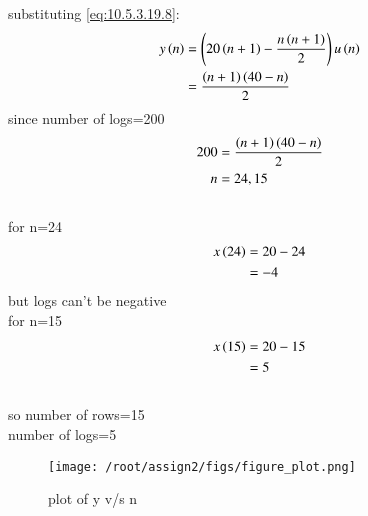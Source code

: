 \documentclass[journal,12pt,twocolumn]{IEEEtran}
\theoremstyle{remark}
\begin{document}
substituting  \eqref{eq:10.5.3.19.8}:
\begin{align}
y\left(n\right)&=\left(20\left(n+1\right)-\frac{n\left(n+1\right)}{2}\right)u\left(n\right)
\\&=\frac{\left(n+1\right)\left(40-n\right)}{2}
\end{align}
since number of logs=200
\begin{align}
 200&=\frac{\left(n+1\right)\left(40-n\right)}{2}   
\\n&=24,15
\end{align}
\\for n=24
\begin{align}
x\left(24\right)&=20-24
\\&={-4}
\end{align}
but logs can't be negative
\\for n=15
\begin{align}
x\left(15\right)&=20-15
\\&=5
\end{align}
\\so number of rows=15
\\number of logs=5
\\\begin{figure}[h]
  \renewcommand\thefigure{1}
    \centering
    \texttt{[image: /root/assign2/figs/figure\_plot.png]}
    \caption{plot of y v/s n}
\end{figure}
\end{document}
